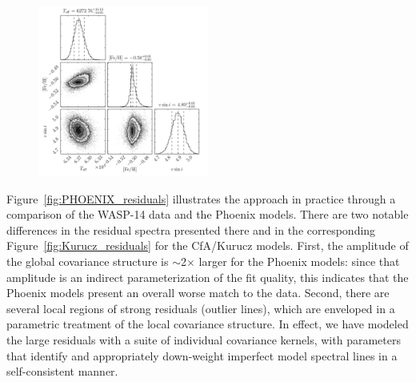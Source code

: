 \documentclass[iop,floatfix]{emulateapj}
\begin{document}
\begin{figure}[!b]
\begin{center}
  \includegraphics[width=0.5\textwidth]{figs/PHOENIX_triangle.pdf}
\end{center}
\end{figure}



Figure~\ref{fig:PHOENIX_residuals} illustrates the approach in practice through a comparison of the 
WASP-14 data and the {\sc Phoenix} models.  There are two notable differences in the residual 
spectra presented there and in the corresponding Figure~\ref{fig:Kurucz_residuals} for the {\sc 
CfA/Kurucz} models.  First, the amplitude of the global covariance structure is $\sim$2$\times$ 
larger for the {\sc Phoenix} models: since that amplitude is an indirect parameterization of the 
fit quality, this indicates that the {\sc Phoenix} models present an overall worse match to the 
data.  Second, there are several local regions of strong residuals (outlier lines), which are 
enveloped in a parametric treatment of the local covariance structure.  In effect, we have modeled 
the large residuals with a suite of individual covariance kernels, with parameters that identify 
and appropriately down-weight imperfect model spectral lines in a self-consistent manner.
\end{document}
